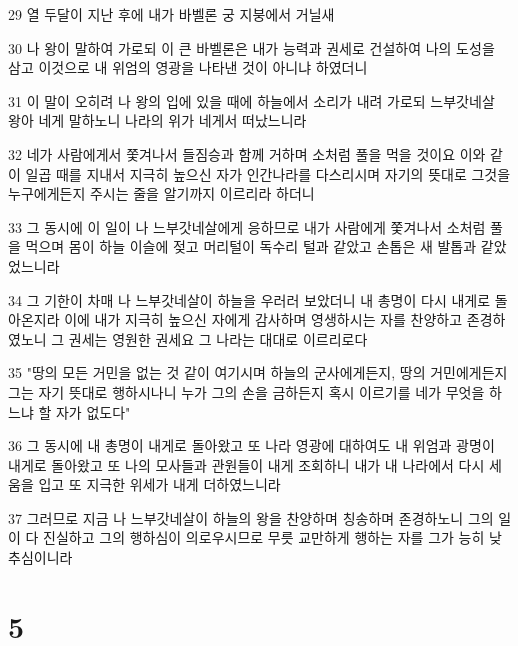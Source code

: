 \par 29 열 두달이 지난 후에 내가 바벨론 궁 지붕에서 거닐새
\par 30 나 왕이 말하여 가로되 이 큰 바벨론은 내가 능력과 권세로 건설하여 나의 도성을 삼고 이것으로 내 위엄의 영광을 나타낸 것이 아니냐 하였더니
\par 31 이 말이 오히려 나 왕의 입에 있을 때에 하늘에서 소리가 내려 가로되 느부갓네살 왕아 네게 말하노니 나라의 위가 네게서 떠났느니라
\par 32 네가 사람에게서 쫓겨나서 들짐승과 함께 거하며 소처럼 풀을 먹을 것이요 이와 같이 일곱 때를 지내서 지극히 높으신 자가 인간나라를 다스리시며 자기의 뜻대로 그것을 누구에게든지 주시는 줄을 알기까지 이르리라 하더니
\par 33 그 동시에 이 일이 나 느부갓네살에게 응하므로 내가 사람에게 쫓겨나서 소처럼 풀을 먹으며 몸이 하늘 이슬에 젖고 머리털이 독수리 털과 같았고 손톱은 새 발톱과 같았었느니라
\par 34 그 기한이 차매 나 느부갓네살이 하늘을 우러러 보았더니 내 총명이 다시 내게로 돌아온지라 이에 내가 지극히 높으신 자에게 감사하며 영생하시는 자를 찬양하고 존경하였노니 그 권세는 영원한 권세요 그 나라는 대대로 이르리로다
\par 35 "땅의 모든 거민을 없는 것 같이 여기시며 하늘의 군사에게든지, 땅의 거민에게든지 그는 자기 뜻대로 행하시나니 누가 그의 손을 금하든지 혹시 이르기를 네가 무엇을 하느냐 할 자가 없도다"
\par 36 그 동시에 내 총명이 내게로 돌아왔고 또 나라 영광에 대하여도 내 위엄과 광명이 내게로 돌아왔고 또 나의 모사들과 관원들이 내게 조회하니 내가 내 나라에서 다시 세움을 입고 또 지극한 위세가 내게 더하였느니라
\par 37 그러므로 지금 나 느부갓네살이 하늘의 왕을 찬양하며 칭송하며 존경하노니 그의 일이 다 진실하고 그의 행하심이 의로우시므로 무릇 교만하게 행하는 자를 그가 능히 낮추심이니라

\chapter{5}

